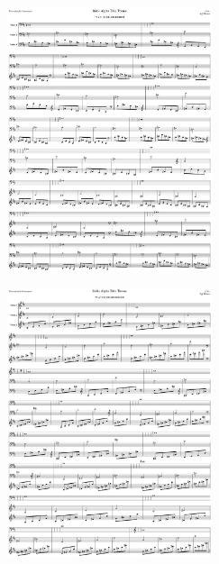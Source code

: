 \begin{figure}[H]                                             
{                                                             
  \setlength{\tabcolsep}{3.0pt}                               
  \setlength\cmidrulewidth{\heavyrulewidth} %
    \begin{subfigure}{0.5\textwidth}                            
  \includegraphics[width=6cm]{music/title_no_75_page_1001.png}%
    \end{subfigure}                                             
  \begin{subfigure}{0.5\textwidth}                            
  \includegraphics[width=6cm]{music/title_no_76_page_1001.png}%
    \end{subfigure}                                             
}                                                             
\end{figure}                                                  


